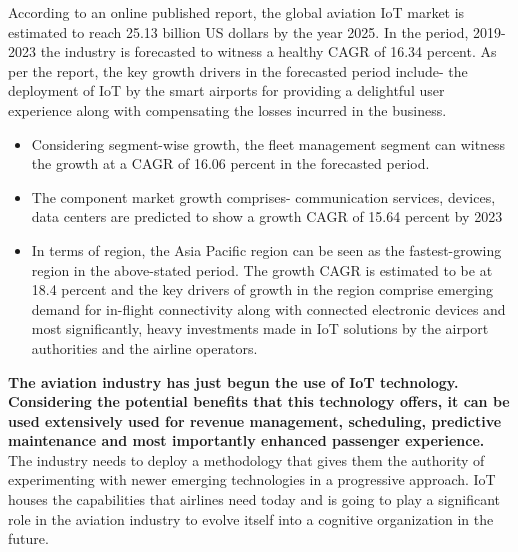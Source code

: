 \documentclass[a4paper,12pt]{article}
\begin{document}
According to an online published report, the global aviation IoT market is estimated to reach 25.13 billion US dollars by the year 2025. In the period, 2019-2023 the industry is forecasted to witness a healthy CAGR of 16.34 percent. As per the report, the key growth drivers in the forecasted period include- the deployment of IoT by the smart airports for providing a delightful user experience along with compensating the losses incurred in the business.

\begin{itemize}
\item{Considering segment-wise growth, the fleet management segment can witness the growth at a CAGR of 16.06 percent in the forecasted period.}
\item{The component market growth comprises- communication services, devices, data centers are predicted to show a growth CAGR of 15.64 percent by 2023}
\item{In terms of region, the Asia Pacific region can be seen as the fastest-growing region in the above-stated period. The growth CAGR is estimated to be at 18.4 percent and the key drivers of growth in the region comprise emerging demand for in-flight connectivity along with connected electronic devices and most significantly, heavy investments made in IoT solutions by the airport authorities and the airline operators.}
\end{itemize}

\textbf{The aviation industry has just begun the use of IoT technology. Considering the potential benefits that this technology offers, it can be used extensively used for revenue management, scheduling, predictive maintenance and most importantly enhanced passenger experience.} The industry needs to deploy a methodology that gives them the authority of experimenting with newer emerging technologies in a progressive approach. IoT houses the capabilities that airlines need today and is going to play a significant role in the aviation industry to evolve itself into a cognitive organization in the future.

\clearpage
\printindex
\end{document}
